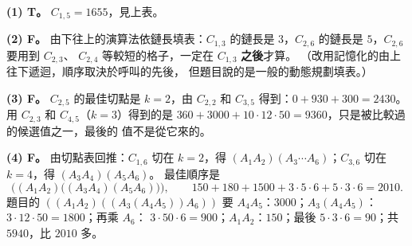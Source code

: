 \begin{pastsoln}
\textbf{(1) T。} $C_{1,5} = 1655$，見上表。

\textbf{(2) F。} 由下往上的演算法依鏈長填表：$C_{1,3}$ 的鏈長是 $3$，$C_{2,6}$ 的鏈長是 $5$，$C_{2,6}$ 要用到 $C_{2,3}$、
$C_{2,4}$ 等較短的格子，一定在 $C_{1,3}$ \textbf{之後}才算。 （改用記憶化的由上往下遞迴，順序取決於呼叫的先後，
但題目說的是一般的動態規劃填表。）

\textbf{(3) F。} $C_{2,5}$ 的最佳切點是 $k = 2$，由 $C_{2,2}$ 和 $C_{3,5}$ 得到：$0 + 930 + 300 = 2430$。 用
$C_{2,3}$ 和 $C_{4,5}$（$k = 3$）得到的是 $360 + 3000 + 10 \cdot 12 \cdot 50 = 9360$，只是被比較過的候選值之一，最後的
值不是從它來的。

\textbf{(4) F。} 由切點表回推：$C_{1,6}$ 切在 $k = 2$，得 $(A_1A_2)(A_3 \cdots A_6)$；$C_{3,6}$ 切在 $k = 4$，得
$(A_3A_4)(A_5A_6)$。 最佳順序是
\[
\bigl((A_1A_2)\bigl((A_3A_4)(A_5A_6)\bigr)\bigr),\qquad 150 + 180 + 1500 + 3 \cdot 5 \cdot 6 + 5 \cdot 3 \cdot 6 = 2010.
\]
題目的 $((A_1A_2)((A_3(A_4A_5))A_6))$ 要 $A_4A_5$：$3000$；$A_3(A_4A_5)$：$3 \cdot 12 \cdot 50 = 1800$；再乘 $A_6$：
$3 \cdot 50 \cdot 6 = 900$；$A_1A_2$：$150$；最後 $5 \cdot 3 \cdot 6 = 90$；共 $5940$，比 $2010$ 多。
\end{pastsoln}
